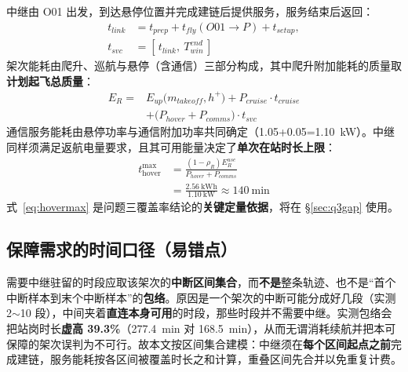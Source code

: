 中继由 O01 出发，到达悬停位置并完成建链后提供服务，服务结束后返回：
\begin{equation}
	\begin{aligned}
		t_{link}&=t_{prep}+t_{fly}(O01\to P)+t_{setup},\\
		t_{svc}&=[\,t_{link},\ T_{win}^{end}\,]
	\end{aligned}
	\label{eq:relaytime}
\end{equation}
架次能耗由爬升、巡航与悬停（含通信）三部分构成，其中爬升附加能耗的质量取\textbf{计划起飞总质量}：
\begin{equation}
	\begin{aligned}
		E_{R}={}&E_{up}\big(m_{takeoff},h^{+}\big)+P_{cruise}\cdot t_{cruise}\\
		       &+\big(P_{hover}+P_{comms}\big)\cdot t_{svc}
	\end{aligned}
	\label{eq:relayen}
\end{equation}
通信服务能耗由悬停功率与通信附加功率共同确定（\SI{1.05}{}+\SI{0.05}{}=\SI{1.10}{kW}）。中继同样须满足返航电量要求，且其可用能量决定了\textbf{单次在站时长上限}：
\begin{equation}
	\begin{aligned}
		t_{\text{hover}}^{\max}&=\frac{(1-\rho_{R})E_{R}^{use}}{P_{hover}+P_{comms}}\\
		                       &=\frac{2.56\ \text{kWh}}{1.10\ \text{kW}}\approx 140\ \text{min}
	\end{aligned}
	\label{eq:hovermax}
\end{equation}
式~\eqref{eq:hovermax} 是问题三覆盖率结论的\textbf{关键定量依据}，将在 \S\ref{sec:q3gap} 使用。

\subsection{保障需求的时间口径（易错点）}

需要中继驻留的时段应取该架次的\textbf{中断区间集合}，而\textbf{不是}整条轨迹、也不是“首个中断样本到末个中断样本”的\textbf{包络}。原因是一个架次的中断可能分成好几段（实测 2$\sim$10 段），中间夹着\textbf{直连本身可用}的时段，那些时段并不需要中继。实测包络会把站岗时长\textbf{虚高 39.3\%}（\SI{277.4}{min} 对 \SI{168.5}{min}），从而无谓消耗续航并把本可保障的架次误判为不可行。故本文按区间集合建模：中继须在\textbf{每个区间起点之前}完成建链，服务能耗按各区间被覆盖时长之和计算，重叠区间先合并以免重复计费。
